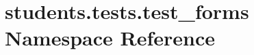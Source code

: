 \hypertarget{namespacestudents_1_1tests_1_1test__forms}{\section{students.\-tests.\-test\-\_\-forms Namespace Reference}
\label{namespacestudents_1_1tests_1_1test__forms}
}

